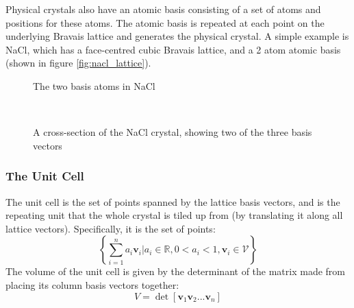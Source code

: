 \documentclass[12pt]{article}
\begin{document}
Physical crystals also have an atomic basis consisting of a set of atoms and positions for these atoms. The atomic basis is repeated at each point on the underlying Bravais lattice and generates the physical crystal. 
A simple example is NaCl, which has a face-centred cubic Bravais lattice, and a 2 atom atomic basis (shown in figure \ref{fig:nacl_lattice}).
\begin{figure*}[t!]
    \centering
    \begin{subfigure}[t]{0.5\textwidth}
    \centering
        \caption{The two basis atoms in NaCl}
	\label{fig:nacl_basis}
    \end{subfigure}%
    ~ 
    \begin{subfigure}[t]{0.5\textwidth}
        \centering
{}
        \caption{A cross-section of the NaCl crystal, showing two of the three basis vectors}
	\label{fig:nacl_crosssection}
    \end{subfigure}
    \caption{NaCl atomic basis and crystal cross-section}
\label{fig:nacl_lattice}
\end{figure*}
\subsubsection{The Unit Cell}
The unit cell is the set of points spanned by the lattice basis vectors, and is the repeating unit that the whole crystal is tiled up from (by translating it along all lattice vectors). Specifically, it is the set of points:
\begin{equation}\label{eq:unit_cell}
	\left\{\sum _{i=1}^n a_i \mathbf v_i \Big| a_i \in \mathbb{R}, 0<a_i<1, \mathbf{v}_i \in \mathcal V \right\}
\end{equation}
The volume of the unit cell is given by the determinant of the matrix made from placing its column basis vectors together:
\begin{equation}
	V = \det [\mathbf{v}_1 \mathbf{v}_2 ... \mathbf{v}_n]
\end{equation}
\end{document}
